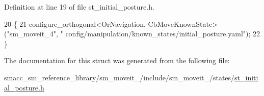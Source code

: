 Definition at line 19 of file st\+\_\+initial\+\_\+posture.\+h.


\begin{DoxyCode}
20     \{
21         configure\_orthogonal<OrNavigation, CbMoveKnownState>(\textcolor{stringliteral}{"sm\_moveit\_4"}, \textcolor{stringliteral}{"
      config/manipulation/known\_states/initial\_posture.yaml"});
22     \}
\end{DoxyCode}


The documentation for this struct was generated from the following file\+:\begin{DoxyCompactItemize}
\item 
smacc\+\_\+sm\+\_\+reference\+\_\+library/sm\+\_\+moveit\+\_/include/sm\+\_\+moveit\+\_/states/\hyperlink{4_2include_2sm__moveit__4_2states_2st__initial__posture_8h}{st\+\_\+initial\+\_\+posture.\+h}\end{DoxyCompactItemize}
